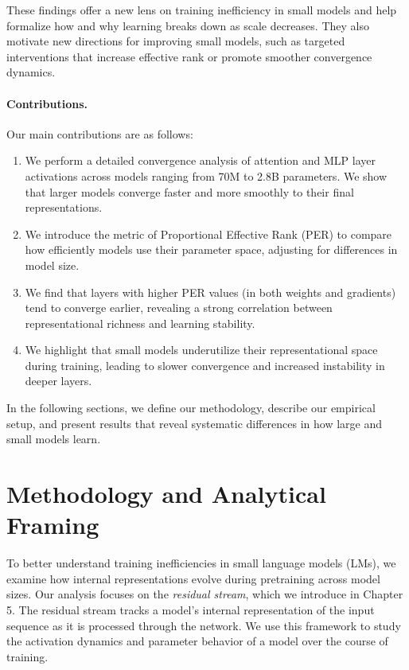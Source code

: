 These findings offer a new lens on training inefficiency in small models and help formalize how and why learning breaks down as scale decreases. They also motivate new directions for improving small models, such as targeted interventions that increase effective rank or promote smoother convergence dynamics.

\paragraph{Contributions.}
Our main contributions are as follows:
\begin{enumerate}
    \item We perform a detailed convergence analysis of attention and MLP layer activations across models ranging from 70M to 2.8B parameters. We show that larger models converge faster and more smoothly to their final representations.

    \item We introduce the metric of Proportional Effective Rank (PER) to compare how efficiently models use their parameter space, adjusting for differences in model size.

    \item We find that layers with higher PER values (in both weights and gradients) tend to converge earlier, revealing a strong correlation between representational richness and learning stability.

    \item We highlight that small models underutilize their representational space during training, leading to slower convergence and increased instability in deeper layers.
\end{enumerate}

In the following sections, we define our methodology, describe our empirical setup, and present results that reveal systematic differences in how large and small models learn.

\section{Methodology and Analytical Framing}
\label{sec:methodology}

To better understand training inefficiencies in small language models (LMs), we examine how internal representations evolve during pretraining across model sizes. Our analysis focuses on the \textit{residual stream}, which we introduce in Chapter 5. The residual stream tracks a model's internal representation of the input sequence as it is processed through the network. We use this framework to study the activation dynamics and parameter behavior of a model over the course of training.

